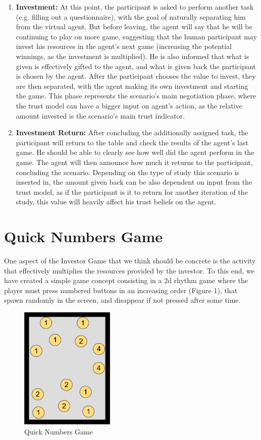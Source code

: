\begin{enumerate}[label=\textbf{\arabic*.}]
    \item \textbf{Investment:} At this point, the participant is asked to perform another task (e.g. filling out a questionnaire), with the goal of naturally separating him from the virtual agent. But before leaving, the agent will say that he will be continuing to play on more game, suggesting that the human participant may invest his resources in the agent's next game (increasing the potential winnings, as the investment is multiplied). He is also informed that what is given is effectively gifted to the agent, and what is given back the participant is chosen by the agent. After the participant chooses the value to invest, they are then separated, with the agent making its own investment and starting the game. This phase represents the scenario's main negotiation phase, where the trust model can have a bigger input on agent's action, as the relative amount invested is the scenario's main trust indicator.
    
    \item \textbf{Investment Return:} After concluding the additionally assigned task, the participant will return to the table and check the results of the agent's last game. He should be able to clearly see how well did the agent perform in the game. The agent will then announce how much it returns to the participant, concluding the scenario. Depending on the type of study this scenario is inserted in, the amount given back can be also dependent on input from the trust model, as if the participant is it to return for another iteration of the study, this value will heavily affect his trust beliefs on the agent.
\end{enumerate}



\section{Quick Numbers Game}
\label{sec:QuickNumbersGame}
One aspect of the Investor Game that we think should be concrete is the activity that effectively multiplies the resources provided by the investor. To this end, we have created a simple game concept consisting in a 2d rhythm game where the player must press numbered buttons in an increasing order (Figure 1), that spawn randomly in the screen, and disappear if not pressed after some time.

\begin{figure}[hbt]
    \centering
    \includegraphics[width=0.4\textwidth]{figures/FallingBoltsDiagram.png}
    \caption{Quick Numbers Game}
    \label{fig:QuickNumbersGame}
\end{figure}

